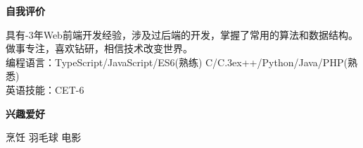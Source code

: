 \documentclass[a4paper]{article}
\newenvironment{changemargin}[2]{%
  \begin{list}{}{%
    \setlength{\topsep}{0pt}%
    \setlength{\leftmargin}{#1}%
    \setlength{\rightmargin}{#2}%
    \setlength{\listparindent}{\parindent}%
    \setlength{\itemindent}{\parindent}%
    \setlength{\parsep}{\parskip}%
  }%
  \item[]}{\end{list}
}
\newcommand{\lineover}{
	\begin{changemargin}{-0.05in}{-0.05in}
		\vspace*{-8pt}
		\hrulefill \\
		\vspace*{-2pt}
	\end{changemargin}
}
\newcommand{\header}[1]{
	\begin{changemargin}{-0.5in}{-0.5in}
	\fontsize{12}{14} \scshape{\textbf{#1}}\\
	\end{changemargin}
}
\newenvironment{body} {
	\vspace*{-16pt}
	\begin{changemargin}{-0.5in}{-0.5in}
  }	
	{\end{changemargin}
}
\begin{document}


\header{自我评价}

\begin{body}
	\vspace{14pt}
	具有{-3}年{\fontarial Web}前端开发经验，涉及过后端的开发，掌握了常用的算法和数据结构。\\
	做事专注，喜欢钻研，相信技术改变世界。\\
	编程语言：{\fontarial TypeScript/JavaScript/ES6}(熟练) {\fontarial C/C\raise.3ex\hbox{\small++}/Python/Java/PHP}(熟悉)\\
	英语技能：{\fontarial CET-6}\\
\end{body}

\medskip





\header{兴趣爱好}

\begin{body}
	\vspace{14pt}
	烹饪 羽毛球 电影\\
\end{body}
\end{document}
